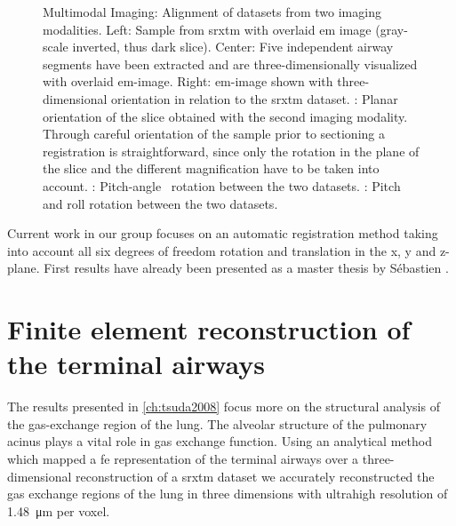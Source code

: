 \begin{figure}[p]
{%
		\label{subfig:correlation-arbitrary3}%
		}%
	\caption[Multimodal Imaging]{Multimodal Imaging: Alignment of datasets from two imaging modalities. Left: Sample from \ac{srxtm} with overlaid \ac{em} image (gray-scale inverted, thus dark slice). Center: Five independent airway segments have been extracted and are three-dimensionally visualized with overlaid \ac{em}-image. Right: \ac{em}-image shown with three-dimensional orientation in relation to the \ac{srxtm} dataset. : Planar orientation of the slice obtained with the second imaging modality. Through careful orientation of the sample prior to sectioning a registration is straightforward, since only the rotation in the plane of the slice and the different magnification have to be taken into account. : Pitch-angle~\cite{YawPitchRoll} rotation between the two datasets. : Pitch and roll rotation between the two datasets.}%
	\label{fig:correlation}%
\end{figure}

Current work in our group focuses on an automatic registration method taking into account all six degrees of freedom \ie rotation and translation in the x, y and z-plane. First results have already been presented as a master thesis by Sébastien \citet{Barre2009}.

\section{Finite element reconstruction of the terminal airways}
The results presented in \autoref{ch:tsuda2008} focus more on the structural analysis of the gas-exchange region of the lung. The alveolar structure of the pulmonary acinus plays a vital role in gas exchange function. Using an analytical method which mapped a \ac{fe} representation of the terminal airways over a three-dimensional reconstruction of a \ac{srxtm} dataset we accurately reconstructed the gas exchange regions of the lung in three dimensions with ultrahigh resolution of \SI{1.48}{\micro\meter} per voxel.

